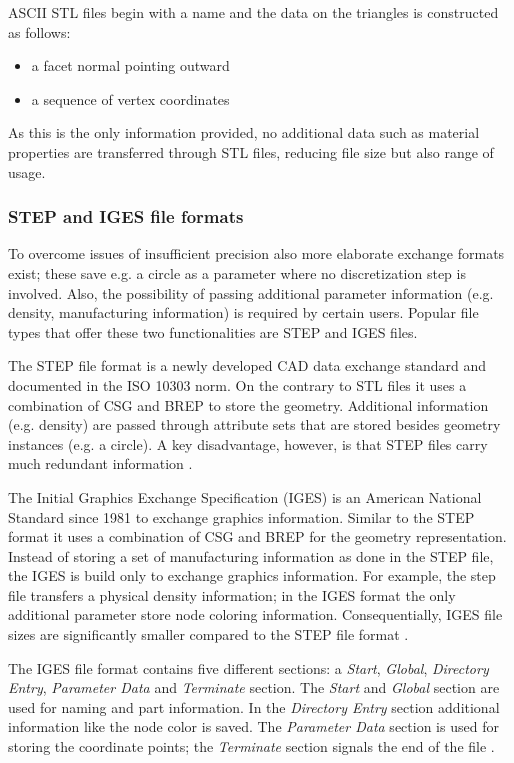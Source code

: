 ASCII STL files begin with a name and the data on the triangles is constructed as follows: 
\begin{itemize}
\item a facet normal pointing outward
\item a sequence of vertex coordinates
\end{itemize}
As this is the only information provided, no additional data such as material properties are transferred through STL files, reducing file size but also range of usage.
\subsubsection{STEP and IGES file formats}
To overcome issues of insufficient precision also more elaborate exchange formats exist; these save e.g. a circle as a parameter where no discretization step is involved. Also, the possibility of passing additional parameter information (e.g. density, manufacturing information) is required by certain users. Popular file types that offer these two functionalities are STEP and IGES files. 

The STEP file format is a newly developed CAD data exchange standard and documented in the ISO 10303 norm. On the contrary to STL files it uses a combination of CSG and BREP to store the geometry. Additional information (e.g. density) are passed through attribute sets that are stored besides geometry instances (e.g. a circle). A key disadvantage, however, is that STEP files carry much redundant information \cite{STL}.


The Initial Graphics Exchange Specification (IGES) is an American 
National Standard since 1981 to exchange graphics information. Similar to the STEP format it uses a combination of CSG and BREP for the geometry representation. Instead of storing a set of manufacturing information as done in the STEP file, the IGES is build only to exchange graphics information. For example, the step file transfers a physical density information; in the IGES format the only additional parameter store node coloring information. Consequentially, IGES file sizes are significantly smaller compared to the STEP file format \cite{STL}.

The IGES file format contains five different sections: a \emph{Start}, \emph{Global}, \emph{Directory Entry}, \emph{Parameter Data} and \emph{Terminate} section. The \emph{Start} and \emph{Global} section are used for naming and part information. In the \emph{Directory Entry} section additional information like the node color is saved. The \emph{Parameter Data} section is used for storing the coordinate points; the \emph{Terminate} section signals the end of the file \cite{sarcarCAD}.
